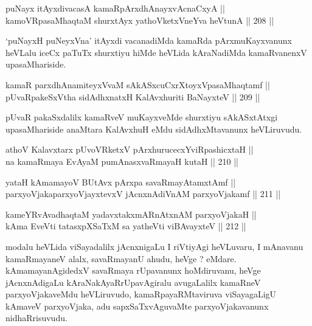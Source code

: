 \begin{shl}
puNayx itAyxdivacasA kamaRpArxdhAnayxvAcnaCxyA || \\
kamoVRpasaMhaqtaM shurxtAyx yathoVketxVneYva heVtunA \hfill || 208 ||  
\end{shl}

\begin{artha}
`puNayxH puNeyxVna' itAyxdi vacanadiMda kamaRda pArxmuKayxvanunx
heVLalu iceCx paTuTx shurxtiyu hiMde heVLida kAraNadiMda
kamaRvanenxV upasaMhariside.
\end{artha}

\begin{shl}
kamaR parxdhAnamiteyxVvaM sAkASxcuCxrXtoyxVpasaMhaqtamf || \\
pUvaRpakeSxV\s tha sidAdhxnatxH KalAvxhuriti BaNayxteV \hfill || 209 ||  
\end{shl}

\begin{artha}
pUvaR pakaSxdalilx kamaRveV muKayxveMde shurxtiyu sAkASxtAtxgi
upasaMhariside anaMtara KalAvxhuH eMdu sidAdhxMtavanunx heVLiruvudu.
\end{artha}


\begin{shl}
athoV Kalavxtarx pUvoVRketxV pArxhurucecxYviRpashicxtaH || \\
na kamaRmaya EvAyaM pumAnasxvaRmayaH kutaH \hfill || 210 ||  
\end{shl}

\begin{shl}
yataH kAmamayoV BUtAvx pArxpa savaRmayAtamxtAmf || \\
parxyoVjakaparxyoVjayxtevxV jAcnxnAdiVnAM parxyoVjakamf \hfill || 211 ||  
\end{shl}

\begin{shl}
kameYRvAvadhaqtaM yadavxtakxmARnAtxnAM parxyoVjakaH || \\
kAma EveVti tatasxpXSaTxM sa yatheVti viBAvayxteV \hfill || 212 ||  
\end{shl}

\begin{artha}
modalu heVLida viSayadalilx jAcnxnigaLu I riVtiyAgi heVLuvaru, I
mAnavanu kamaRmayaneV alalx, savaRmayanU ahudu, heVge ?
eMdare. kAmamayanAgidedxV savaRmaya rUpavanunx hoMdiruvanu, heVge
jAcnxnAdigaLu kAraNakAyaRrUpavAgiralu avugaLalilx kamaRneV
parxyoVjakaveMdu heVLiruvudo, kamaRpayaRMtaviruva viSayagaLigU
kAmaveV parxyoVjaka, adu sapxSaTxvAguvaMte parxyoVjakavanunx
nidhaRrisuvudu.
\end{artha}

